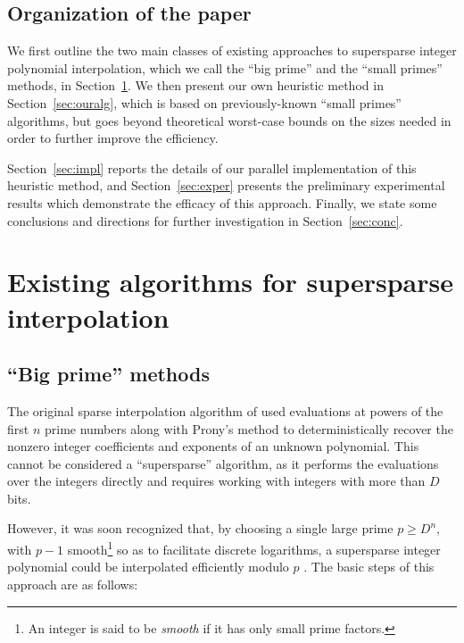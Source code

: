 \documentclass[letterpaper,10pt]{article}
\def\cite{\citep}
\begin{document}
\subsection{Organization of the paper}

We first outline the two main classes of existing approaches to
supersparse integer polynomial interpolation, which we call the ``big
prime'' and the ``small primes'' methods, in Section~\ref{sec:exist}. We
then present our own heuristic method in Section~\ref{sec:ouralg}, 
which is based
on previously-known ``small primes'' algorithms, but goes beyond
theoretical worst-case bounds on the sizes needed in order to further
improve the efficiency.

Section~\ref{sec:impl} reports the details of our parallel
implementation of this heuristic method, and Section~\ref{sec:exper}
presents the preliminary experimental results which demonstrate the
efficacy of this approach. Finally, we state some conclusions and directions for
further investigation in Section~\ref{sec:conc}.

\section{Existing algorithms for supersparse interpolation}
\label{sec:exist}

\subsection{``Big prime'' methods}

The original sparse interpolation 
algorithm of \cite{BT88} used evaluations at powers of the first $n$
prime numbers along with Prony's method to deterministically recover the
nonzero integer coefficients and exponents of an unknown polynomial.
This cannot be considered a ``supersparse'' algorithm, as it
performs the evaluations over the integers directly and
requires working with integers with more than $D$ bits.

However, it was soon recognized that, by choosing a single large prime
$p \ge D^n$, with $p-1$ smooth\footnote{
  An integer is said to be \emph{smooth} if it has only small prime
  factors.
} so as to facilitate discrete logarithms,
a supersparse integer polynomial could be interpolated efficiently
modulo $p$ \cite{KLW90,Kal10a}. The basic steps of this approach are as
follows:
\end{document}
